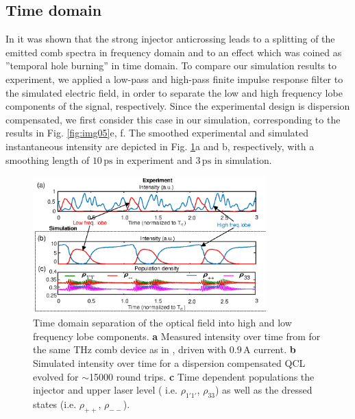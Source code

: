 \documentclass[10pt]{article}
\begin{document}
	\subsection{Time domain}
	\label{sec:timedomain}	
	In \cite{burghoff2015evaluating} it was shown that the strong injector
	anticrossing leads to a splitting of the emitted comb spectra in frequency
	domain and to an effect which was coined as ''temporal hole burning'' in time
	domain. To compare our simulation results to experiment, we applied a low-pass
	and high-pass finite impulse response filter to the simulated electric field,
	in order to separate the low and high frequency lobe components of the signal,
	respectively. Since the experimental design is dispersion compensated, we
	first consider this case in our simulation, corresponding to the results in
	Fig. \ref{fig:img05}e, f. The smoothed experimental and simulated
	instantaneous intensity are depicted in Fig. \ref{fig:img06}a and b,
	respectively, with a smoothing length of\textrm{ }$10{\,}\mathrm{ps}$ in experiment
	and $3{\,}\mathrm{ps}$ in simulation.
		
	\begin{figure}[h!]
		\begin{center}
			\includegraphics[width=9cm]{TEMPHOLEBURNING_EXPERIMENT.eps}
		\end{center}
		\caption{Time domain separation of the optical field into high and low
			frequency lobe components. \textbf{a} Measured intensity over time from
			\cite{burghoff2015evaluating} for the same THz comb device as in
			\cite{burghoff2014terahertz}, driven with $0.9{\,}\mathrm{A}$ current.
			\textbf{b} Simulated intensity over time for a dispersion compensated QCL
			evolved for $\sim$15000 round trips. \textbf{c} Time dependent populations the
			injector and upper laser level ( i.e. $\rho_{1'1'}$, $\rho_{33}$) as well as the dressed states (i.e. $\rho_{++}$, $\rho_{--}$).}%
		\label{fig:img06}%
	\end{figure}
		
\end{document}
